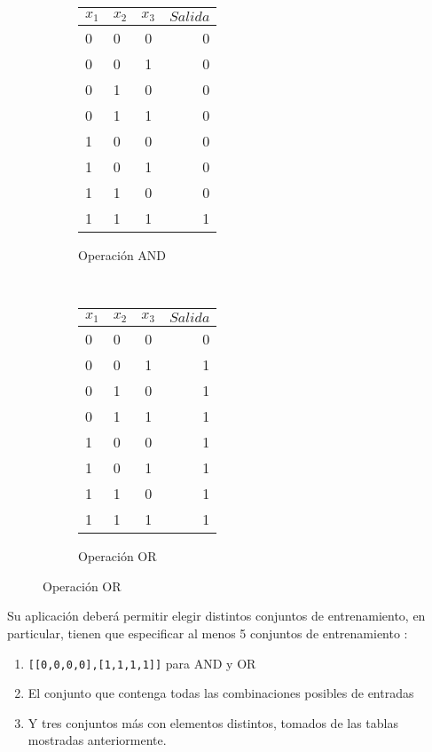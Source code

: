 \begin{figure}[H]
    \centering
    \begin{subfigure}[b]{0.4\textwidth}
        \centering
        \begin{tabular}{ l l c | r }
          $x_1$ & $x_2$ & $x_3$ & $Salida$\\ \hline
          0 & 0 & 0 & 0  \\ \hline
          0 & 0 & 1 & 0  \\ \hline
          0 & 1 & 0 & 0  \\ \hline
          0 & 1 & 1 & 0  \\ \hline
          1 & 0 & 0 & 0  \\ \hline
          1 & 0 & 1 & 0  \\ \hline
          1 & 1 & 0 & 0  \\ \hline
          1 & 1 & 1 & 1  \\
        \end{tabular}
        \caption{Operación AND}
    \end{subfigure}
    ~ 
    \begin{subfigure}[b]{0.4\textwidth}
        \centering
        \begin{tabular}{ l l c | r }
          $x_1$ & $x_2$ & $x_3$ & $Salida$\\ \hline
          0 & 0 & 0 & 0  \\ \hline
          0 & 0 & 1 & 1  \\ \hline
          0 & 1 & 0 & 1  \\ \hline
          0 & 1 & 1 & 1  \\ \hline
          1 & 0 & 0 & 1  \\ \hline
          1 & 0 & 1 & 1  \\ \hline
          1 & 1 & 0 & 1  \\ \hline
          1 & 1 & 1 & 1  \\
        \end{tabular}
        \caption{Operación OR}
    \end{subfigure}
\end{figure}

Su aplicación deberá permitir elegir distintos conjuntos de entrenamiento, en particular, tienen que especificar al menos 5 conjuntos de entrenamiento : 

\begin{enumerate}
  \item \texttt{[[0,0,0,0],[1,1,1,1]]} para AND y OR
  \item El conjunto que contenga todas las combinaciones posibles de entradas
  \item Y tres conjuntos más con elementos distintos, tomados de las tablas mostradas anteriormente.
\end{enumerate}

